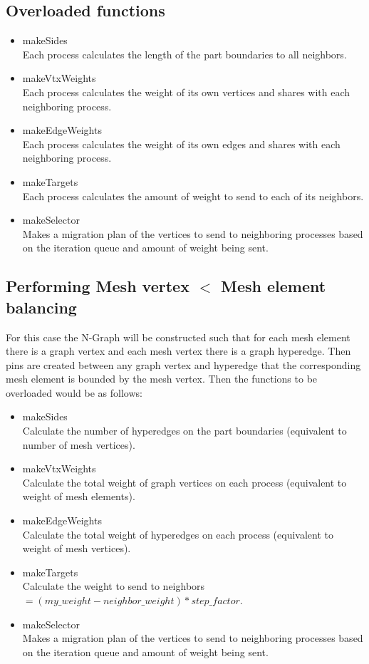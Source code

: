 \documentclass[a4paper]{article}
\begin{document}
\subsection{Overloaded functions}
\begin{itemize}
  \item makeSides\\
    Each process calculates the length of the part boundaries to all neighbors.
  \item makeVtxWeights \\
    Each process calculates the weight of its own vertices and shares with each neighboring process.
  \item makeEdgeWeights \\
    Each process calculates the weight of its own edges and shares with each neighboring process.
  \item makeTargets\\
    Each process calculates the amount of weight to send to each of its neighbors.
  \item makeSelector\\
    Makes a migration plan of the vertices to send to neighboring processes based on the iteration queue and amount of weight being sent.
\end{itemize}

\subsection{Performing Mesh vertex $<$ Mesh element balancing}
For this case the N-Graph will be constructed such that for each mesh element there is a graph vertex and each mesh vertex there is a graph hyperedge. Then pins are created between any graph vertex and hyperedge that the corresponding mesh element is bounded by the mesh vertex. Then the functions to be overloaded would be as follows:
\begin{itemize}
  \item makeSides\\
    Calculate the number of hyperedges on the part boundaries (equivalent to number of mesh vertices).
  \item makeVtxWeights \\
    Calculate the total weight of graph vertices on each process (equivalent to weight of mesh elements).
  \item makeEdgeWeights \\
    Calculate the total weight of hyperedges on each process (equivalent to weight of mesh vertices).
  \item makeTargets\\
    Calculate the weight to send to neighbors $= (my\_weight-neighbor\_weight)*step\_factor$.
  \item makeSelector\\
    Makes a migration plan of the vertices to send to neighboring processes based on the iteration queue and amount of weight being sent.
\end{itemize}
\end{document}
